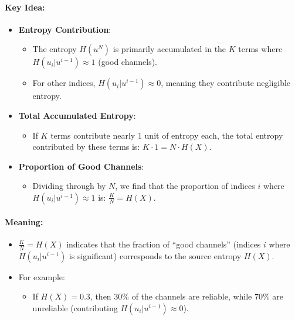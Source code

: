 \documentclass[11pt]{article}
\providecommand{\tightlist}{%
      \setlength{\itemsep}{0pt}\setlength{\parskip}{0pt}}
\begin{document}
\paragraph{Key Idea:}\label{key-idea}

\begin{itemize}
\tightlist
\item
  \textbf{Entropy Contribution}:

  \begin{itemize}
  \tightlist
  \item
    The entropy \(H(u^N)\) is primarily accumulated in the \(K\) terms
    where \(H(u_i | u^{i-1}) \approx 1\) (good channels).
  \item
    For other indices, \(H(u_i | u^{i-1}) \approx 0\), meaning they
    contribute negligible entropy.
  \end{itemize}
\item
  \textbf{Total Accumulated Entropy}:

  \begin{itemize}
  \tightlist
  \item
    If \(K\) terms contribute nearly \(1\) unit of entropy each, the
    total entropy contributed by these terms is:
    \(K \cdot 1 = N \cdot H(X).\)
  \end{itemize}
\item
  \textbf{Proportion of Good Channels}:

  \begin{itemize}
  \tightlist
  \item
    Dividing through by \(N\), we find that the proportion of indices
    \(i\) where \(H(u_i | u^{i-1}) \approx 1\) is:
    \(\frac{K}{N} = H(X).\)
  \end{itemize}
\end{itemize}

\paragraph{Meaning:}\label{meaning}

\begin{itemize}
\tightlist
\item
  \(\frac{K}{N} = H(X)\) indicates that the fraction of ``good
  channels'' (indices \(i\) where \(H(u_i | u^{i-1})\) is significant)
  corresponds to the source entropy \(H(X)\).
\item
  For example:

  \begin{itemize}
  \tightlist
  \item
    If \(H(X) = 0.3\), then 30\% of the channels are reliable, while
    70\% are unreliable (contributing \(H(u_i | u^{i-1}) \approx 0\)).
  \end{itemize}
\end{itemize}
\end{document}
